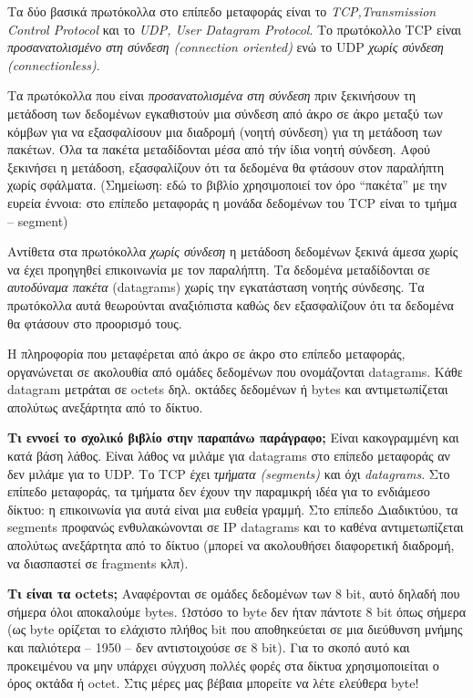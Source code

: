 Τα δύο βασικά πρωτόκολλα στο επίπεδο μεταφοράς είναι το \emph{TCP,Transmission Control Protocol} και το \emph{UDP, User Datagram Protocol}. Το πρωτόκολλο TCP είναι \emph{προσανατολισμένο στη σύνδεση (connection oriented)} ενώ το UDP \emph{χωρίς σύνδεση (connectionless)}.

Τα πρωτόκολλα που είναι \emph{προσανατολισμένα στη σύνδεση} πριν ξεκινήσουν τη μετάδοση των δεδομένων εγκαθιστούν μια σύνδεση από άκρο σε άκρο μεταξύ των κόμβων για να εξασφαλίσουν μια διαδρομή (νοητή σύνδεση) για τη μετάδοση των πακέτων. Όλα τα πακέτα μεταδίδονται μέσα από τήν ίδια νοητή σύνδεση. Αφού ξεκινήσει η μετάδοση, εξασφαλίζουν ότι τα δεδομένα θα φτάσουν στον παραλήπτη χωρίς σφάλματα. (Σημείωση: εδώ το βιβλίο χρησιμοποιεί τον όρο ``πακέτα'' με την ευρεία έννοια: στο επίπεδο μεταφοράς η μονάδα δεδομένων του TCP είναι το τμήμα -- segment)

Αντίθετα στα πρωτόκολλα \emph{χωρίς σύνδεση} η μετάδοση δεδομένων ξεκινά άμεσα χωρίς να έχει προηγηθεί επικοινωνία με τον παραλήπτη. Τα δεδομένα μεταδίδονται σε \emph{αυτοδύναμα πακέτα} (datagrams) χωρίς την εγκατάσταση νοητής σύνδεσης. Τα πρωτόκολλα αυτά θεωρούνται αναξιόπιστα καθώς δεν εξασφαλίζουν ότι τα δεδομένα θα φτάσουν στο προορισμό τους.

Η πληροφορία που μεταφέρεται από άκρο σε άκρο στο επίπεδο μεταφοράς,  οργανώνεται σε ακολουθία από ομάδες δεδομένων που ονομάζονται datagrams. Κάθε datagram μετράται σε octets δηλ. οκτάδες δεδομένων ή bytes και αντιμετωπίζεται απολύτως ανεξάρτητα από το δίκτυο.

\begin{inthebox}
\textbf{Τι εννοεί το σχολικό βιβλίο στην παραπάνω παράγραφο;} Είναι κακογραμμένη και κατά βάση λάθος.  Είναι λάθος να μιλάμε για datagrams στο επίπεδο μεταφοράς αν δεν μιλάμε για το UDP. Το TCP έχει \emph{τμήματα (segments)} και όχι \emph{datagrams}. Στο επίπεδο μεταφοράς, τα τμήματα δεν έχουν την παραμικρή ιδέα για το ενδιάμεσο δίκτυο: η επικοινωνία για αυτά είναι μια ευθεία γραμμή. Στο επίπεδο Διαδικτύου, τα segments προφανώς ενθυλακώνονται σε IP datagrams και το καθένα αντιμετωπίζεται απολύτως ανεξάρτητα από το δίκτυο (μπορεί να ακολουθήσει διαφορετική διαδρομή, να διασπαστεί σε fragments κλπ).\\ 
\end{inthebox}

\textbf{Τι είναι τα octets;} Αναφέρονται σε ομάδες δεδομένων των 8 bit, αυτό δηλαδή που σήμερα όλοι αποκαλούμε bytes. Ωστόσο το byte δεν ήταν πάντοτε 8 bit όπως σήμερα (ως byte ορίζεται το ελάχιστο πλήθος bit που αποθηκεύεται σε μια διεύθυνση μνήμης και παλιότερα -- 1950 -- δεν αντιστοιχούσε σε 8 bit). Για το σκοπό αυτό και προκειμένου να μην υπάρχει σύγχυση πολλές φορές στα δίκτυα χρησιμοποιείται ο όρος οκτάδα ή octet. Στις μέρες μας βέβαια μπορείτε να λέτε ελεύθερα byte! 

 
